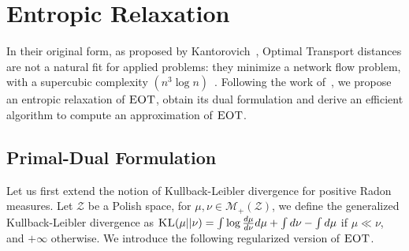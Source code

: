\section{Entropic Relaxation}
\label{sec:entropic}
In their original form, as proposed by Kantorovich~\cite{Kantorovich42}, Optimal Transport distances are not a natural fit for applied problems: they minimize a network flow problem, with a supercubic complexity $(n^3 \log n)$~\citep{Tarjan1997}. Following the work of~\cite{cuturi2013sinkhorn}, we propose an entropic relaxation of $\textsc{EOT}$, obtain its dual formulation and derive an efficient algorithm to compute an approximation of $\textsc{EOT}$. 

\subsection{Primal-Dual Formulation}
Let us first extend the notion of Kullback-Leibler divergence for positive Radon measures. Let $\mathcal{Z}$ be a Polish space, for $\mu,\nu\in\mathcal{M}_+(\mathcal{Z})$, we define the generalized Kullback-Leibler divergence as $\textsc{KL}(\mu||\nu) = \int\log{\frac{d\mu}{d\nu}}d\mu+\int  d\nu - \int d\mu$  if $\mu\ll \nu$, and $+\infty$ otherwise.  We introduce the following regularized version of $\textsc{EOT}$.

